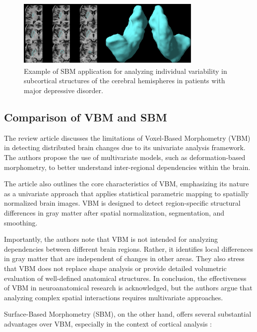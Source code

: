 \documentclass[default]{subfiles}
\begin{document}
\begin{figure}[H]
    \centering
    \includegraphics[width=0.8\textwidth]{image/pic1.png}
    \caption{
      Example of SBM application for analyzing individual variability in subcortical structures of the cerebral
      hemispheres in patients with major depressive disorder.
    }
\end{figure}

\subsection{Comparison of VBM and SBM}

The review article \cite{friston_2004} discusses the limitations of Voxel-Based Morphometry (VBM) in detecting
distributed brain changes due to its univariate analysis framework. The authors propose the use of multivariate models,
such as deformation-based morphometry, to better understand inter-regional dependencies within the brain.

The article also outlines the core characteristics of VBM, emphasizing its nature as a univariate approach that applies
statistical parametric mapping to spatially normalized brain images. VBM is designed to detect region-specific
structural differences in gray matter after spatial normalization, segmentation, and smoothing.

Importantly, the authors note that VBM is not intended for analyzing dependencies between different brain regions.
Rather, it identifies local differences in gray matter that are independent of changes in other areas. They also stress
that VBM does not replace shape analysis or provide detailed volumetric evaluation of well-defined anatomical
structures. In conclusion, the effectiveness of VBM in neuroanatomical research is acknowledged, but the authors argue
that analyzing complex spatial interactions requires multivariate approaches.

Surface-Based Morphometry (SBM), on the other hand, offers several substantial advantages over VBM, especially in the
context of cortical analysis \cite{evans_2015, friston_2004, voets_2008, lai_2020}:\newline
\end{document}
